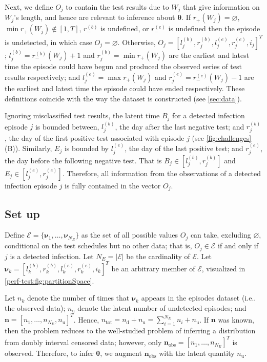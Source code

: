 \documentclass[referee,useAMS,usenatbib]{biom}
\makeatletter
\newcommand\set{\mathcal}
\renewcommand{\vec}[1]{\bm{#1}}
\newcommand{\ntot}{n_\text{tot}}
\newcommand{\ndet}{n_\text{d}}
\newcommand{\nnodet}{n_\text{u}}
\newcommand{\na}{\vec{n}_\text{obs}}
\newcommand{\posResults}{r_{+}}
\newcommand{\negResults}{r_{-}}
\DeclareRobustCommand\onedot{\futurelet\@let@token\@onedot}
\def\@onedot{\ifx\@let@token.\else.\null\fi\xspace}
\def\ie{i.e\onedot} \def\Ie{{I.e}\onedot}
\makeatother
\begin{document}
Next, we define $O_j$ to contain the test results due to $W_j$ that give information on $W_j$'s length, and hence are relevant to inference about $\vec{\theta}$.
If $\posResults(W_j) = \varnothing$, $\min \posResults(W_j) \notin [1, T]$, $\negResults^{(b)}$ is undefined, or $\negResults^{(e)}$ is undefined then the episode is undetected, in which case $O_j = \varnothing$.
Otherwise, $O_j = [l_j^{(b)}, r_j^{(b)}, l_j^{(e)}, r_j^{(e)}, i_j]^T$; $l_j^{(b)} = \negResults^{(b)}(W_j) + 1$ and $r_j^{(b)} = \min \posResults(W_j)$ are the earliest and latest time the episode could have begun and produced the observed series of test results respectively; and $l_j^{(e)} = \max \posResults(W_j)$ and $r_j^{(e)} = \negResults^{(e)}(W_j) - 1$ are the earliest and latest time the episode could have ended respectively.
These definitions coincide with the way the dataset is constructed (see \cref{sec:data}).

Ignoring misclassified test results, the latent time $B_j$ for a detected infection episode $j$ is bounded between, $l_j^{(b)}$, the day after the last negative test; and $r_j^{(b)}$, the day of the first positive test associated with episode $j$ (see \cref{fig:challenges}(B)).
Similarly, $E_j$ is bounded by $l_j^{(e)}$, the day of the last positive test; and $r_j^{(e)}$, the day before the following negative test.
That is $B_j \in [l_j^{(b)}, r_j^{(b)}]$ and $E_j \in [l_j^{(e)}, r_j^{(e)}]$.
Therefore, all information from the observations of a detected infection episode $j$ is fully contained in the vector $O_j$.

\subsection{Set up} \label{sec:inference}

Define $\set{E} = \{ \vec{\nu}_1, \dots, \vec{\nu}_{N_E} \}$ as the set of all possible values $O_j$ can take, excluding $\varnothing$, conditional on the test schedules but no other data; that is, $O_j \in \set{E}$ if and only if $j$ is a detected infection.
Let $N_E = |\set{E}|$ be the cardinality of $\set{E}$. 
Let $\vec{\nu}_k = [l^{(b)}_k, r^{(b)}_k, l^{(e)}_k, r^{(e)}_k, i_k]^T$ be an arbitrary member of $\set{E}$, visualized in \cref{perf-test:fig:partitionSpace}.

Let $n_k$ denote the number of times that $\vec{\nu}_k$ appears in the episodes dataset (\ie the observed data); $\nnodet$ denote the latent number of undetected episodes; and $\vec{n} = [n_1, \dots, n_{N_E}, \nnodet]^T$.
Hence, $\ntot = \ndet + \nnodet = \sum_{i=1}^{N_E} n_i + \nnodet$.
If $\vec{n}$ was known, then the problem reduces to the well-studied problem of inferring a distribution from doubly interval censored data; however, only $\na = [n_1, \dots, n_{N_E}]^T$ is observed.
Therefore, to infer $\vec\theta$, we augment $\na$ with the latent quantity $\nnodet$.
\end{document}
